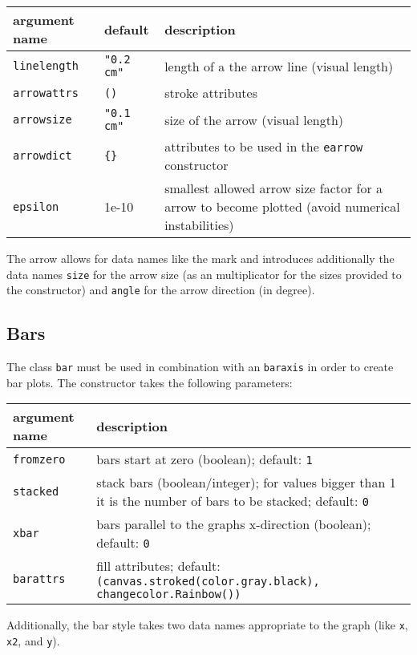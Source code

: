 \medskip
\begin{tabularx}{\linewidth}{ll>{\raggedright\arraybackslash}X}
argument name&default&description\\
\hline
\texttt{linelength}&\texttt{"0.2 cm"}&length of a the arrow line (visual length)\\
\texttt{arrowattrs}&\texttt{()}&stroke attributes\\
\texttt{arrowsize}&\texttt{"0.1 cm"}&size of the arrow (visual length)\\
\texttt{arrowdict}&\texttt{\{\}}&attributes to be used in the \texttt{earrow} constructor\\
\texttt{epsilon}&1e-10&smallest allowed arrow size factor for a arrow to become plotted (avoid numerical instabilities)\\
\end{tabularx}
\medskip

The arrow allows for data names like the mark and introduces
additionally the data names \verb|size| for the arrow size (as an
multiplicator for the sizes provided to the constructor) and
\verb|angle| for the arrow direction (in degree).

\subsection{Bars}

The class \verb|bar| must be used in combination with an
\verb|baraxis| in order to create bar plots. The constructor takes the
following parameters:

\medskip
\begin{tabularx}{\linewidth}{l>{\raggedright\arraybackslash}X}
argument name&description\\
\hline
\texttt{fromzero}&bars start at zero (boolean); default: \texttt{1}\\
\texttt{stacked}&stack bars (boolean/integer); for values bigger than 1 it is the number of bars to be stacked; default: \texttt{0}\\
\texttt{xbar}&bars parallel to the graphs x-direction (boolean); default: \texttt{0}\\
\texttt{barattrs}&fill attributes; default: \texttt{(canvas.stroked(color.gray.black), changecolor.Rainbow())}\\
\end{tabularx}

Additionally, the bar style takes two data names appropriate to the
graph (like \verb|x|, \verb|x2|, and \verb|y|).

